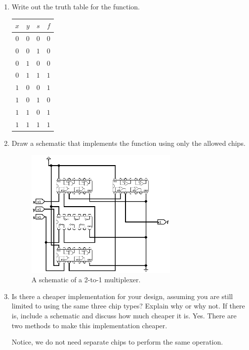 \documentclass{article}
\begin{document}
\begin{enumerate}

\item Write out the truth table for the function.
\begin{center}
\begin{tabular}{ccc|c}
$x$&$y$&$s$&$f$\\
\hline
$0$&$0$&$0$&$0$\\
$0$&$0$&$1$&$0$\\
$0$&$1$&$0$&$0$\\
$0$&$1$&$1$&$1$\\
$1$&$0$&$0$&$1$\\
$1$&$0$&$1$&$0$\\
$1$&$1$&$0$&$1$\\
$1$&$1$&$1$&$1$\\
\end{tabular}
\end{center}
\item Draw a schematic that implements the function using only the allowed chips.

\begin{figure}[!ht]
    \centering
    \includegraphics[width=0.7\textwidth]{lab1_part1.png}
    \caption{A schematic of a 2-to-1 multiplexer.}
    \label{f:lab1_part1}
\end{figure}

\item Is there a cheaper implementation for your design, assuming you are still limited to using the same three chip types?
    Explain why or why not.
    If there is, include a schematic and discuss how much cheaper it is.
Yes. There are two methods to make this implementation cheaper.

Notice, we do not need separate chips to perform the same operation.


\end{enumerate}
\end{document}

